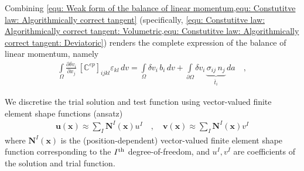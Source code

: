 \documentclass[]{scrartcl}
\begin{document}
Combining \cref{equ: Weak form of the balance of linear momentum,equ: Constutitve law: Algorithmically correct tangent} (specifically, \cref{equ: Constutitve law: Algorithmically correct tangent: Volumetric,equ: Constutitve law: Algorithmically correct tangent: Deviatoric}) renders the complete expression of the balance of linear momentum, namely
\begin{gather}
\int\limits_{\Omega} \frac{\partial \delta v_{i}}{\partial x_{j}} \, \left[ \boldsymbol{\mathbb{C}}^{ep} \right]_{ijkl} \varepsilon_{kl} \, dv
  = \int\limits_{\Omega} \delta v_{i} \, b_{i} \, dv
  + \int\limits_{\partial\Omega} \delta v_{i} \, \underbrace{\sigma_{ij} \, n_{j}}_{\bar{t}_{i}} \, da
\quad ,
\label{equ: Weak form of the balance of linear momentum: Muscle model}
\end{gather}

We discretise the trial solution and test function using vector-valued finite element shape functions (ansatz)
\begin{gather}
\mathbf{u} \left( \mathbf{x} \right)
  \approx \sum\limits_{I} \mathbf{N}^{I} \left( \mathbf{x} \right) u^{I}
\quad , \quad
\mathbf{v} \left( \mathbf{x} \right)
  \approx \sum\limits_{I} \mathbf{N}^{I} \left( \mathbf{x} \right) v^{I}
\end{gather}
where $\mathbf{N}^{I} \left( \mathbf{x} \right)$ is the (position-dependent) vector-valued finite element shape function corresponding to the $I^{\textnormal{th}}$ degree-of-freedom, and $u^{I}, v^{I}$ are coefficients of the solution and trial function.
\end{document}
